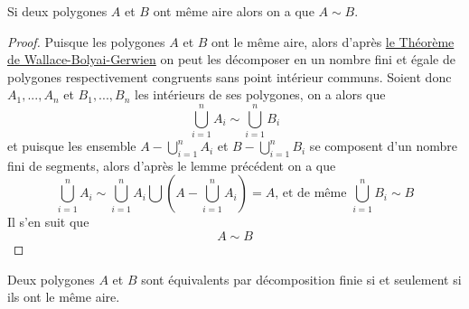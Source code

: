 \begin{TTT}
  Si deux polygones $A$ et $B$ ont même aire alors on a que $A \sim B$.
\end{TTT}
\begin{proof}
  Puisque les polygones $A$ et $B$ ont le même aire, alors d'après \hyperref[wbg]{le Théorème de Wallace-Bolyai-Gerwien} on peut les décomposer en un nombre fini et égale de polygones respectivement congruents sans point intérieur communs. Soient donc $A_1, ..., A_n$ et $B_1,...,B_n$ les intérieurs de ses polygones, on a alors que $$\bigcup_{i=1}^n A_i \sim \bigcup_{i=1}^n B_i$$
  et puisque les ensemble $A - \bigcup_{i=1}^n A_i$ et $B -\bigcup_{i=1}^n B_i$ se composent d'un nombre fini de segments,  alors d'après le lemme précédent on a que $$\bigcup_{i=1}^n A_i \sim \bigcup_{i=1}^n A_i \bigcup \left(A - \bigcup_{i=1}^n A_i\right)=A \text{, et de même } \bigcup_{i=1}^n B_i \sim B$$
  Il s'en suit que $$A \sim B$$
\end{proof}
\begin{Coo}
  Deux polygones $A$ et $B$ sont équivalents par décomposition finie si et seulement si ils ont le même aire.
\end{Coo}
